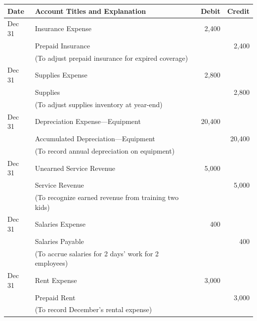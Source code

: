 \documentclass[12pt,a4paper]{book}
\begin{document}
\begin{center}
\begin{tabular}{|l|l|r|r|}
\hline
\textbf{Date} & \textbf{Account Titles and Explanation} & \textbf{Debit} & \textbf{Credit} \\
\hline
Dec 31 & Insurance Expense & 2,400 & \\
       & \quad Prepaid Insurance & & 2,400 \\
       & (To adjust prepaid insurance for expired coverage) & & \\
\hline
Dec 31 & Supplies Expense & 2,800 & \\
       & \quad Supplies & & 2,800 \\
       & (To adjust supplies inventory at year-end) & & \\
\hline
Dec 31 & Depreciation Expense—Equipment & 20,400 & \\
       & \quad Accumulated Depreciation—Equipment & & 20,400 \\
       & (To record annual depreciation on equipment) & & \\
\hline
Dec 31 & Unearned Service Revenue & 5,000 & \\
       & \quad Service Revenue & & 5,000 \\
       & (To recognize earned revenue from training two kids) & & \\
\hline
Dec 31 & Salaries Expense & 400 & \\
       & \quad Salaries Payable & & 400 \\
       & (To accrue salaries for 2 days' work for 2 employees) & & \\
\hline
Dec 31 & Rent Expense & 3,000 & \\
       & \quad Prepaid Rent & & 3,000 \\
       & (To record December's rental expense) & & \\
\hline
\end{tabular}
\end{center}

\vspace{0.5cm}
\end{document}
